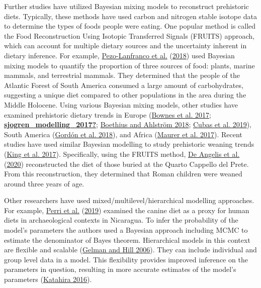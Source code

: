 \documentclass[
]{article}
\begin{document}
Further studies have utilized Bayesian mixing models to reconstruct
prehistoric diets. Typically, these methods have used carbon and
nitrogen stable isotope data to determine the types of foods people were
eating. One popular method is called the Food Reconstruction Using
Isotopic Transferred Signals (FRUITS) approach, which can account for
multiple dietary sources and the uncertainty inherent in dietary
inference. For example,
\protect\hyperlink{ref-pezo-lanfranco_middle_2018}{Pezo-Lanfranco et
al.} (\protect\hyperlink{ref-pezo-lanfranco_middle_2018}{2018}) used
Bayesian mixing models to quantify the proportion of three sources of
food: plants, marine mammals, and terrestrial mammals. They determined
that the people of the Atlantic Forest of South America consumed a large
amount of carbohydrates, suggesting a unique diet compared to other
populations in the area during the Middle Holocene. Using various
Bayesian mixing models, other studies have examined prehistoric dietary
trends in Europe (\protect\hyperlink{ref-bownes_using_2017}{Bownes et
al. 2017};
\protect\hyperlink{ref-sjogren_modelling_2017}{\textbf{sjogren\_modelling\_2017?}};
\protect\hyperlink{ref-boethius_fish_2018}{Boethius and Ahlström 2018};
\protect\hyperlink{ref-cubas_long-term_2019}{Cubas et al. 2019}), South
America (\protect\hyperlink{ref-gordon_dietary_2018}{Gordón et al.
2018}), and Africa
(\protect\hyperlink{ref-maurer_geochemical_2017}{Maurer et al. 2017}).
Recent studies have used similar Bayesian modelling to study prehistoric
weaning trends (\protect\hyperlink{ref-king_comparison_2017}{King et al.
2017}). Specifically, using the FRUITS method,
\protect\hyperlink{ref-de_angelis_dietary_2020}{De Angelis et al.}
(\protect\hyperlink{ref-de_angelis_dietary_2020}{2020}) reconstructed
the diet of those buried at the Quarto Cappello del Prete. From this
reconstruction, they determined that Roman children were weaned around
three years of age.

Other researchers have used mixed/multilevel/hierarchical modelling
approaches. For example,
\protect\hyperlink{ref-perri_dietary_2019}{Perri et al.}
(\protect\hyperlink{ref-perri_dietary_2019}{2019}) examined the canine
diet as a proxy for human diets in archaeological contexts in Nicaragua.
To infer the probability of the model's parameters the authors used a
Bayesian approach including MCMC to estimate the denominator of Bayes
theorem. Hierarchical models in this context are flexible and scalable
(\protect\hyperlink{ref-gelman_data_2006}{Gelman and Hill 2006}). They
can include individual and group level data in a model. This flexibility
provides improved inference on the parameters in question, resulting in
more accurate estimates of the model's parameters
(\protect\hyperlink{ref-katahira_how_2016}{Katahira 2016}).
\end{document}
